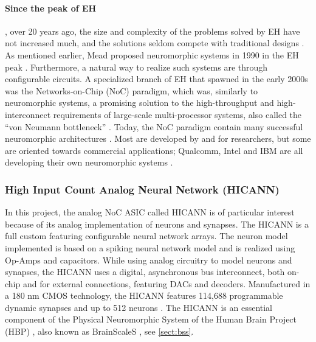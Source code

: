 \paragraph{Since the peak of EH}, over 20 years ago, the size and complexity of the problems solved by EH have not increased much, and the solutions seldom compete with traditional designs \cite{haddow_challenges_2011}.
As mentioned earlier, Mead proposed neuromorphic systems in 1990 in the EH peak \cite{mead_neuromorphic_1990}.
Furthermore, a natural way to realize such systems are through configurable circuits.
A specialized branch of EH that spawned in the early 2000s was the Networks-on-Chip (NoC) paradigm,
which was, similarly to neuromorphic systems, a promising solution to the high-throughput and high-interconnect requirements of large-scale multi-processor systems, also called the  ``von Neumann bottleneck'' \cite{benini_networks_2002}\cite{trefzer_evolvable_2015}\cite{mead_neuromorphic_1990}.
Today, the NoC paradigm contain many successful neuromorphic architectures \cite{trefzer_evolvable_2015}.
Most are developed by and for researchers, but some are oriented towards commercial applications;
Qualcomm, Intel and IBM are all developing their own neuromorphic systems \cite{meier_mixed-signal_2015}\cite{davies_loihi_2018}\cite{debole_truenorth_2019}\cite{trefzer_evolvable_2015}.

\subsubsection{High Input Count Analog Neural Network (HICANN)} \label{sect:hicann}
In this project, the analog NoC ASIC called HICANN is of particular interest\cite{schemmel_wafer-scale_2008} because of its analog implementation of neurons and synapses.
 The HICANN is a full custom featuring configurable neural network arrays.
The neuron model implemented is based on a spiking neural network model and is realized using Op-Amps and capacitors.
While using analog circuitry to model neurons and synapses, the HICANN uses a digital, asynchronous bus interconnect, both on-chip and for external connections, featuring DACs and decoders.
Manufactured in a 180 nm CMOS technology, the HICANN features 114,688 programmable dynamic synapses and up to 512 neurons \cite{zoschke_full_2017}.
\cite{haddow_challenges_2011}\cite{trefzer_evolvable_2015}
The HICANN is an essential component of the Physical Neuromorphic System of the Human Brain Project (HBP) \cite{markram_introducing_2011}, also known as BrainScaleS \cite{meier_mixed-signal_2015}, see \vref{sect:bss}.






















